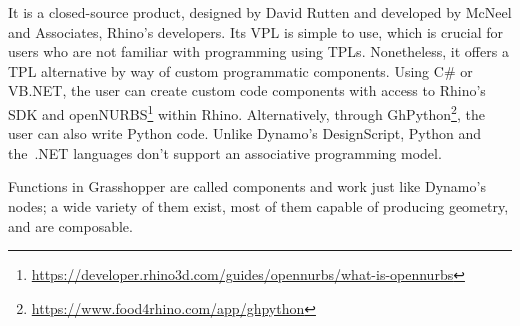 
It is a closed-source product, designed by David Rutten and developed by McNeel
and Associates, Rhino's developers.  Its \ac{VPL} is simple to use, which is
crucial for users who are not familiar with programming using \acp{TPL}.
Nonetheless, it offers a \ac{TPL} alternative by way of custom programmatic
components.  Using C\# or VB.NET, the user can create custom code components
with access to Rhino's \ac{SDK} and
openNURBS\footnote{\url{https://developer.rhino3d.com/guides/opennurbs/what-is-opennurbs}}
within Rhino.  Alternatively, through GhPython\footnote{\url{https://www.food4rhino.com/app/ghpython}}, the
user can also write Python code.  Unlike Dynamo's DesignScript, Python and
the~.NET languages don't support an associative programming model.

Functions in Grasshopper are called components and work just like Dynamo's
nodes; a wide variety of them exist, most of them capable of producing geometry,
and are composable.
